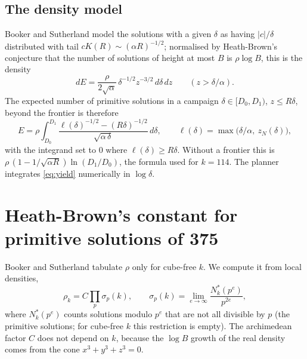 \documentclass[11pt,a4paper]{article}
\theoremstyle{remark}
\begin{document}
\subsection{The density model}
Booker and Sutherland model the solutions with a given $\delta$ as having $|c|/\delta$ distributed
with tail $cK(R)\sim(\alpha R)^{-1/2}$; normalised by Heath-Brown's conjecture \cite{HB} that the
number of solutions of height at most $B$ is $\rho\log B$, this is the density
\[
  dE=\frac{\rho}{2\sqrt\alpha}\,\delta^{-1/2}z^{-3/2}\,d\delta\,dz\qquad(z>\delta/\alpha).
\]
The expected number of primitive solutions in a campaign $\delta\in[D_0,D_1)$, $z\le R\delta$,
beyond the frontier is therefore
\begin{equation}\label{eq:yield}
  E=\rho\int_{D_0}^{D_1}\frac{\ell(\delta)^{-1/2}-(R\delta)^{-1/2}}{\sqrt{\alpha\,\delta}}\,d\delta,
  \qquad \ell(\delta)=\max\bigl(\delta/\alpha,\ z_N(\delta)\bigr),
\end{equation}
with the integrand set to $0$ where $\ell(\delta)\ge R\delta$. Without a frontier this is
$\rho\,(1-1/\sqrt{\alpha R})\ln(D_1/D_0)$, the formula used for $k=114$. The planner integrates
\eqref{eq:yield} numerically in $\log\delta$.

\section{Heath-Brown's constant for primitive solutions of 375}\label{sec:rho}

Booker and Sutherland tabulate $\rho$ only for cube-free $k$. We compute it from local densities,
\[
  \rho_k=C\prod_p\sigma_p(k),\qquad \sigma_p(k)=\lim_{e\to\infty}\frac{N^*_k(p^e)}{p^{2e}},
\]
where $N^*_k(p^e)$ counts solutions modulo $p^e$ that are not all divisible by $p$ (the primitive
solutions; for cube-free $k$ this restriction is empty). The archimedean factor $C$ does not depend
on $k$, because the $\log B$ growth of the real density comes from the cone $x^3+y^3+z^3=0$.
\end{document}
